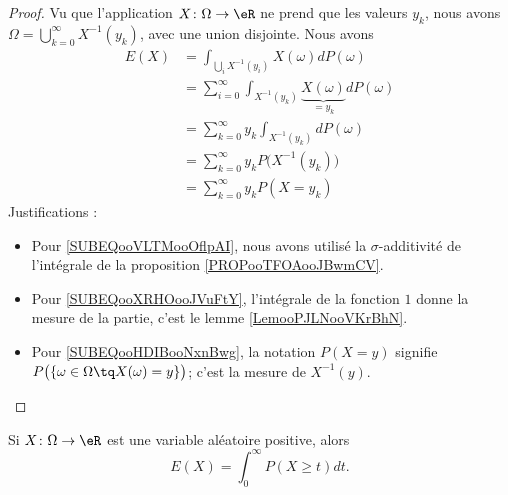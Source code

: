 \begin{proof}
	Vu que l'application \( X\colon \Omega\to \eR\) ne prend que les valeurs \( y_k\), nous avons \( \Omega=\bigcup_{k=0}^{\infty}X^{-1}(y_k)\), avec une union disjointe. Nous avons
	\begin{subequations}
		\begin{align}
			E(X) & =\int_{\bigcup_iX^{-1}(y_i)}X(\omega)dP(\omega)                                                                \\
			     & =\sum_{i=0}^{\infty}\int_{X^{-1}(y_k)}\underbrace{X(\omega)}_{=y_k}dP(\omega)      \label{SUBEQooVLTMooOflpAI} \\
			     & =\sum_{k=0}^{\infty}y_k\int_{X^{-1}(y_k)}dP(\omega)                                                            \\
			     & =\sum_{k=0}^{\infty}y_kP\big( X^{-1}(y_k) \big)        \label{SUBEQooXRHOooJVuFtY}                             \\
			     & =\sum_{k=0}^{\infty}y_kP(X=y_k)        \label{SUBEQooHDIBooNxnBwg}
		\end{align}
	\end{subequations}
	Justifications :
	\begin{itemize}
		\item
		      Pour \eqref{SUBEQooVLTMooOflpAI}, nous avons utilisé la \( \sigma\)-additivité de l'intégrale de la proposition \ref{PROPooTFOAooJBwmCV}.
		\item
		      Pour \eqref{SUBEQooXRHOooJVuFtY}, l'intégrale de la fonction \( 1\) donne la mesure de la partie, c'est le lemme \ref{LemooPJLNooVKrBhN}.
		\item
		      Pour \eqref{SUBEQooHDIBooNxnBwg}, la notation \( P(X=y)\) signifie \( P\big( \{ \omega\in \Omega \tq X(\omega)=y\}\big)\); c'est la mesure de \( X^{-1}(y)\).
	\end{itemize}
\end{proof}

\begin{proposition}	\label{PROPooHJZWooGCpKLf}
	Si \(X \colon \Omega\to \eR  \) est une variable aléatoire positive, alors
	\begin{equation}
		E(X)=\int_0^{\infty}P(X\geq t)dt.
	\end{equation}
\end{proposition}

